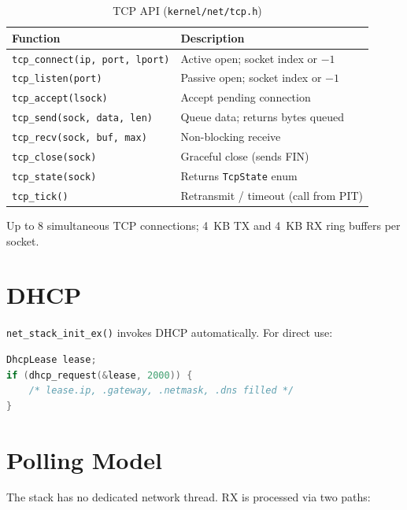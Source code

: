 \documentclass[11pt,a4paper]{report}
\begin{document}
\begin{table}[h]
\centering
\begin{tabular}{ll}
\toprule
\textbf{Function} & \textbf{Description} \\
\midrule
\texttt{tcp\_connect(ip, port, lport)} & Active open; socket index or $-1$ \\
\texttt{tcp\_listen(port)} & Passive open; socket index or $-1$ \\
\texttt{tcp\_accept(lsock)} & Accept pending connection \\
\texttt{tcp\_send(sock, data, len)} & Queue data; returns bytes queued \\
\texttt{tcp\_recv(sock, buf, max)} & Non-blocking receive \\
\texttt{tcp\_close(sock)} & Graceful close (sends FIN) \\
\texttt{tcp\_state(sock)} & Returns \texttt{TcpState} enum \\
\texttt{tcp\_tick()} & Retransmit / timeout (call from PIT) \\
\bottomrule
\end{tabular}
\caption{TCP API (\texttt{kernel/net/tcp.h})}
\end{table}

\noindent Up to 8 simultaneous TCP connections; 4~KB TX and 4~KB RX ring
buffers per socket.

\section{DHCP}

\texttt{net\_stack\_init\_ex()} invokes DHCP automatically.  For direct
use:

\begin{lstlisting}[language=C]
DhcpLease lease;
if (dhcp_request(&lease, 2000)) {
    /* lease.ip, .gateway, .netmask, .dns filled */
}
\end{lstlisting}

\section{Polling Model}

The stack has no dedicated network thread.  RX is processed via two paths:
\end{document}
